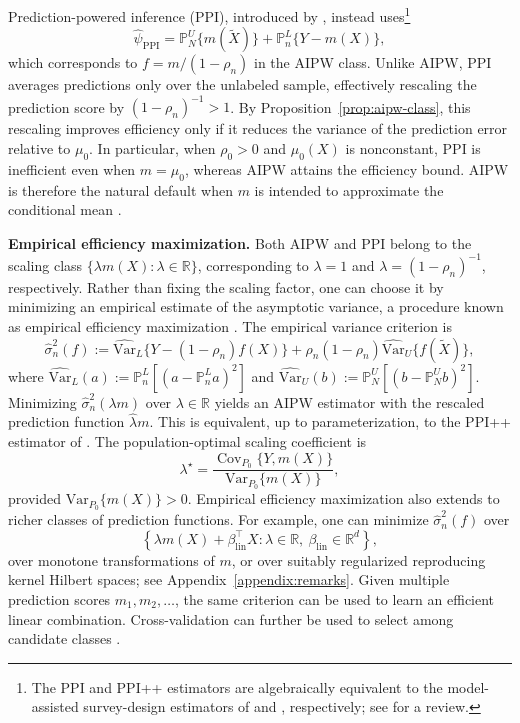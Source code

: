 \documentclass{article}
\theoremstyle{plain}
\theoremstyle{definition}
\newcommand{\Var}{\mathrm{Var}}
\newcommand{\1}{\mathbbm{1}}
\newcommand{\rhozero}{\rho_0}
\newcommand{\Pl}{\mathbb{P}^{L}_n}
\newcommand{\Pu}{\mathbb{P}^{U}_N}
\newcommand{\Cov}{\operatorname{Cov}}
\begin{document}
Prediction-powered inference (PPI), introduced by \citet{ppi2023},
instead uses\footnote{The PPI and PPI++ estimators are algebraically
equivalent to the model-assisted survey-design estimators of
\citet{cassel1976some} and \citet{sarndal2003model}, respectively;
see \citet{mozer2026ppi} for a review.}
\[
\widehat{\psi}_{\mathrm{PPI}}
=
\Pu\{m(\widetilde X)\}+\Pl\{Y-m(X)\},
\]
which corresponds to $f=m/(1-\rho_n)$ in the AIPW class.
Unlike AIPW, PPI averages predictions only over the unlabeled
sample, effectively rescaling the prediction score by
$(1-\rho_n)^{-1}>1$. By Proposition~\ref{prop:aipw-class},
this rescaling improves efficiency only if it reduces the
variance of the prediction error relative to $\mu_0$.
In particular, when $\rhozero>0$ and $\mu_0(X)$ is nonconstant,
PPI is inefficient even when $m=\mu_0$, whereas AIPW attains
the efficiency bound. AIPW is therefore the natural default
when $m$ is intended to approximate the conditional mean
\citep{han2012note,rotnitzky2012improved}.

\textbf{Empirical efficiency maximization.}
Both AIPW and PPI belong to the scaling class
$\{\lambda m(X):\lambda\in\mathbb R\}$, corresponding to
$\lambda=1$ and $\lambda=(1-\rho_n)^{-1}$, respectively.
Rather than fixing the scaling factor, one can choose it by
minimizing an empirical estimate of the asymptotic variance,
a procedure known as empirical efficiency maximization
\citep{rubin2008empirical,vanderlaanunified}.
The empirical variance criterion is
\[
\widehat\sigma_n^2(f)
:=
\widehat{\Var}_L\{Y-(1-\rho_n)f(X)\}
+\rho_n(1-\rho_n)\widehat{\Var}_U\{f(\widetilde X)\},
\]
where \(\widehat{\Var}_L(a):=\Pl[(a-\Pl a)^2]\) and
\(\widehat{\Var}_U(b):=\Pu[(b-\Pu b)^2]\).
Minimizing $\widehat\sigma_n^2(\lambda m)$ over
$\lambda\in\mathbb R$ yields an AIPW estimator with the
rescaled prediction function $\hat\lambda m$. This is
equivalent, up to parameterization, to the PPI++ estimator
of \citet{angelopoulos2023ppi}. The population-optimal
scaling coefficient is
\begin{equation}
\label{opt:scale}
\lambda^\star
=
\frac{\Cov_{P_0}\{Y,m(X)\}}{\Var_{P_0}\{m(X)\}},
\end{equation}
provided $\Var_{P_0}\{m(X)\}>0$. Empirical efficiency maximization also extends to richer
classes of prediction functions. For example, one can
minimize $\widehat\sigma_n^2(f)$ over
\[
\left\{
\lambda m(X)+\beta_{\mathrm{lin}}^\top X:
\lambda\in\mathbb R,\
\beta_{\mathrm{lin}}\in\mathbb R^d
\right\},
\]
over monotone transformations of $m$, or over suitably
regularized reproducing kernel Hilbert spaces; see
Appendix~\ref{appendix:remarks}. Given multiple prediction
scores $m_1,m_2,\ldots$, the same criterion can be used
to learn an efficient linear combination. Cross-validation
can further be used to select among candidate classes
\citep{rubin2008empirical}.
\end{document}
